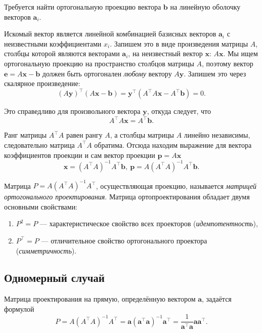 \documentclass[11pt,a4paper]{article}
\providecommand{\tightlist}{%
      \setlength{\itemsep}{0pt}\setlength{\parskip}{0pt}}
\begin{document}
Требуется найти ортогональную проекцию вектора \(\mathbf{b}\) на
линейную оболочку векторов \(\mathbf{a}_i\).

Искомый вектор является линейной комбинацией базисных векторов
\(\mathbf{a}_i\) с неизвестными коэффициентами \(x_i\). Запишем это в
виде произведения матрицы \(A\), столбцы которой являются векторами
\(\mathbf{a}_i\), на неизвестный вектор \(\mathbf{x}\): \(A\mathbf{x}\).
Мы ищем ортогональную проекцию на пространство столбцов матрицы \(A\),
поэтому вектор \(\mathbf{e} = A\mathbf{x} - \mathbf{b}\) должен быть
ортогонален \emph{любому} вектору \(A\mathbf{y}\). Запишем это через
скалярное произведение: \[
  (A \mathbf{y})^\top(A\mathbf{x} - \mathbf{b}) = \mathbf{y}^\top (A^\top A \mathbf{x} - A^\top \mathbf{b}) = 0.
\]

Это справедливо для произвольного вектора \(\mathbf{y}\), откуда
следует, что \[
  A^\top A \mathbf{x} = A^\top \mathbf{b}.
\]

Ранг матрицы \(A^\top A\) равен рангу \(A\), а столбцы матрицы \(A\)
линейно независимы, следовательно матрица \(A^\top A\) обратима. Отсюда
находим выражение для вектора коэффициентов проекции и сам вектор
проекции \(\mathbf{p} = A\mathbf{x}\) \[
  \mathbf{x} = (A^\top A)^{-1} A^\top \mathbf{b}, \
  \mathbf{p} = A (A^\top A)^{-1} A^\top \mathbf{b}.
\]

Матрица \(P = A (A^\top A)^{-1} A^\top\), осуществляющая проекцию,
называется \emph{матрицей ортогонального проектирования}. Матрица
ортопроектирования обладает двумя основными свойствами:

\begin{enumerate}
\def\labelenumi{\arabic{enumi}.}
\tightlist
\item
  \(P^2 = P\) --- характеристическое свойство всех проекторов
  (\emph{идемпотентность}),
\item
  \(P^\top = P\) --- отличительное свойство ортогонального проектора
  (\emph{симметричность}).
\end{enumerate}

    \hypertarget{ux43eux434ux43dux43eux43cux435ux440ux43dux44bux439-ux441ux43bux443ux447ux430ux439}{%
\subsection{Одномерный
случай}\label{ux43eux434ux43dux43eux43cux435ux440ux43dux44bux439-ux441ux43bux443ux447ux430ux439}}

Матрица проектирования на прямую, определённую вектором \(\mathbf{a}\),
задаётся формулой
\[ P = A (A^\top A)^{-1} A^\top = \mathbf{a} (\mathbf{a^\top}\mathbf{a})^{-1}\mathbf{a^\top} = \frac{1}{\mathbf{a^\top}\mathbf{a}} \mathbf{a} \mathbf{a^\top}. \]
\end{document}
